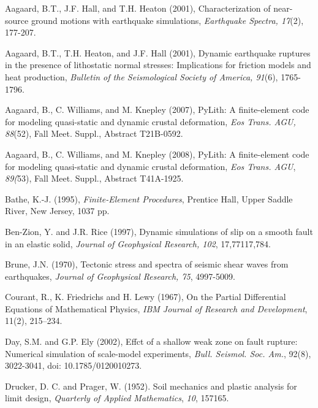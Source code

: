\documentclass{pylithdoc}
\begin{document}
\begin{thebibliography}{widestentry}
Aagaard, B.T.,
J.F. Hall, and T.H. Heaton (2001), Characterization of near-source
ground motions with earthquake simulations, \emph{Earthquake Spectra,
17}(2), 177-207.

Aagaard, B.T.,
T.H. Heaton, and J.F. Hall (2001), Dynamic earthquake ruptures in
the presence of lithostatic normal stresses: Implications for friction
models and heat production, \emph{Bulletin of the Seismological Society
of America, 91}(6), 1765-1796.

Aagaard, B., C.
Williams, and M. Knepley (2007), PyLith: A finite-element code for
modeling quasi-static and dynamic crustal deformation, \emph{Eos Trans.
AGU, 88}(52), Fall Meet. Suppl., Abstract T21B-0592.

Aagaard, B., C.
Williams, and M. Knepley (2008), PyLith: A finite-element code for
modeling quasi-static and dynamic crustal deformation, \emph{Eos Trans.
AGU}, \emph{89(}53), Fall Meet. Suppl., Abstract T41A-1925.

Bathe, K.-J. (1995), \textit{Finite-Element
Procedures}, Prentice Hall, Upper Saddle River, New Jersey, 1037 pp.

Ben-Zion, Y.
and J.R. Rice (1997), Dynamic simulations of slip on a smooth fault
in an elastic solid, \emph{Journal of Geophysical Research}\textit{,
102}, 17,771\textendash{}17,784.

Brune, J.N. (1970), Tectonic stress
and spectra of seismic shear waves from earthquakes, \emph{Journal
of Geophysical Research, 75}, 4997-5009.

Courant, R., K.
Friedrichs and H. Lewy (1967), On the Partial Differential Equations
of Mathematical Physics, \textit{IBM Journal of Research and Development},
11(2), 215--234.

Day, S.M. and G.P. Ely (2002),
Effct of a shallow weak zone on fault rupture: Numerical simulation
of scale-model experiments, \textit{Bull. Seismol. Soc. Am.}, 92(8),
3022-3041, doi: 10.1785/0120010273.

Drucker, D.
C. and Prager, W. (1952). Soil mechanics and plastic analysis for
limit design, \textit{Quarterly of Applied Mathematics}, \textit{10},
157\textendash{}165.


\end{thebibliography}
\end{document}
